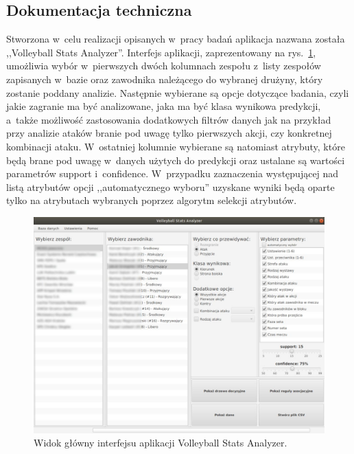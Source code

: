 \documentclass[a4paper,twoside,12pt]{book}
\newcounter{stronyPozaNumeracja}
\begin{document}
\backmatter
{}
\setcounter{page}{\value{stronyPozaNumeracja}}

\pagestyle{tylkoNumeryStron}





\begin{appendices} 


\chapter*{Dokumentacja techniczna}
\label{cha:dokumentacja-techniczna}

Stworzona w~celu realizacji opisanych w~pracy badań aplikacja nazwana została ,,Volleyball Stats Analyzer''. Interfejs aplikacji, zaprezentowany na rys.~\ref{fig:interfejs}, umożliwia wybór w~pierwszych dwóch kolumnach zespołu z~listy zespołów zapisanych w~bazie oraz zawodnika należącego do wybranej drużyny, który zostanie poddany analizie. Następnie wybierane są opcje dotyczące badania, czyli jakie zagranie ma być analizowane, jaka ma być klasa wynikowa predykcji, a~także możliwość zastosowania dodatkowych filtrów danych jak na przykład przy analizie ataków branie pod uwagę tylko pierwszych akcji, czy konkretnej kombinacji ataku. W~ostatniej kolumnie wybierane są natomiast atrybuty, które będą brane pod uwagę w~danych użytych do predykcji oraz ustalane są wartości parametrów support i~confidence. W~przypadku zaznaczenia występującej nad listą atrybutów opcji ,,automatycznego wyboru'' uzyskane wyniki będą oparte tylko na atrybutach wybranych poprzez algorytm selekcji atrybutów.

\begin{figure}
\centering
\includegraphics[width=\columnwidth]{interfejs}
\caption{Widok główny interfejsu aplikacji Volleyball Stats Analyzer.}
\label{fig:interfejs}
\end{figure}


\end{appendices}
\end{document}
